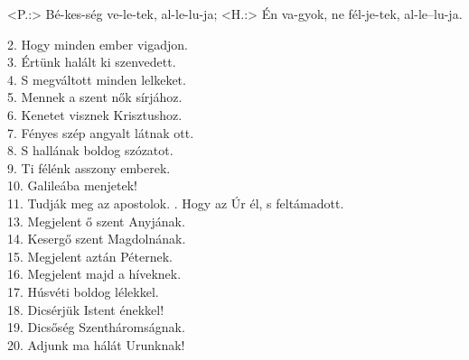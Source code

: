 \documentclass[twoside]{article}
\begin{document}

\begin{gregosheet}
            {   <P.:> Bé-kes-ség ve-le-tek, al-le-lu-ja;   <H.:> Én va-gyok, ne fél-je-tek, al-le--lu-ja.}
\end{gregosheet}




\begin{hymnstanzas}
  2. Hogy minden ember vigadjon. \\
  3. Értünk halált ki szenvedett. \\
  4. S megváltott minden lelkeket. \\
  5. Mennek a szent nők sírjához. \\
  6. Kenetet visznek Krisztushoz. \\
  7. Fényes szép angyalt látnak ott. \\
  8. S hallának boldog szózatot. \\
  9. Ti félénk asszony emberek. \\
  10. Galileába menjetek! \\
  11. Tudják meg az apostolok.
. Hogy az Úr él, s feltámadott. \\
  13. Megjelent ő szent Anyjának. \\
  14. Kesergő szent Magdolnának. \\
  15. Megjelent aztán Péternek. \\
  16. Megjelent majd a híveknek. \\
  17. Húsvéti boldog lélekkel. \\
  18. Dicsérjük Istent énekkel! \\
  19. Dicsőség Szentháromságnak. \\
  20. Adjunk ma hálát Urunknak!
\end{hymnstanzas}
\end{document}
